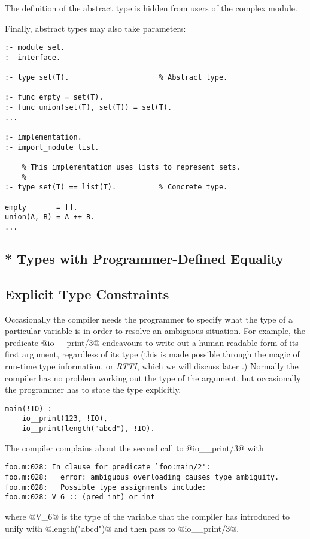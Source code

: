 The definition of the abstract type is hidden from users of
the complex module.

Finally, abstract types may also take parameters:
\begin{verbatim}
:- module set.
:- interface.

:- type set(T).                     % Abstract type.

:- func empty = set(T).
:- func union(set(T), set(T)) = set(T).
...

:- implementation.
:- import_module list.

    % This implementation uses lists to represent sets.
    %
:- type set(T) == list(T).          % Concrete type.

empty       = [].
union(A, B) = A ++ B.
...
\end{verbatim}

\subsection{* Types with Programmer-Defined Equality}


\subsection{Explicit Type Constraints}

Occasionally the compiler needs the programmer to specify what the type
of a particular variable is in order to resolve an ambiguous situation.
For example, the predicate @io__print/3@ endeavours to write out a human
readable form of its first argument, regardless of its type (this is
made possible through the magic of run-time type information, or
\emph{RTTI}, which we will discuss later \XXX{}.) Normally the compiler
has no problem working out the type of the argument, but occasionally
the programmer has to state the type explicitly.
\begin{verbatim}
main(!IO) :-
    io__print(123, !IO),
    io__print(length("abcd"), !IO).
\end{verbatim}
The compiler complains about the second call to @io__print/3@
with
\begin{verbatim}
foo.m:028: In clause for predicate `foo:main/2':
foo.m:028:   error: ambiguous overloading causes type ambiguity.
foo.m:028:   Possible type assignments include:
foo.m:028: V_6 :: (pred int) or int
\end{verbatim}
where @V_6@ is the type of the variable that the compiler has
introduced to unify with @length("abcd")@ and then pass to
@io__print/3@.

